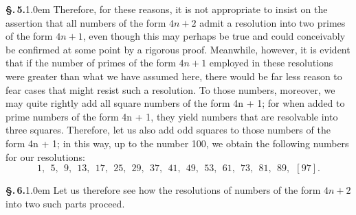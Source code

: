 \documentclass[12pt]{article}
\newcommand{\pnum}[1]{\textbf{\S.\,#1.}\kern1.0em}
\begin{document}
\pnum{5} Therefore, for these reasons, it is not appropriate to insist on the assertion that all numbers of the form $4n + 2$ admit a resolution into two primes of the form 
$4n + 1$, even though this may perhaps be true and could conceivably be confirmed at some point by a rigorous proof. Meanwhile, however, it is evident that if the number of primes of the form $4n + 1$ employed in these resolutions were greater than what we have assumed here, there would be far less reason to fear cases that might resist such a resolution. To those numbers, moreover, we may quite rightly add all square numbers of the form 4n + 1; for when added to prime numbers of the form 4n + 1, they yield numbers that are resolvable into three squares. Therefore, let us also add odd squares to those numbers of the form 4n + 1; in this way, up to the number 100, we obtain the following numbers for our resolutions:
$$1, \ \ 5, \ \ 9, \ \ 13, \ \ 17, \ \ 25, \ \ 29, \ \ 37, \ \ 41, \ \ 49, \ \ 53, \ \ 61, \ \ 73, \ \ 81, \ \ 89, \ \ [97].$$

\pnum{6} Let us therefore see how the resolutions of numbers of the form $4n+2$
into two such parts proceed. \\
\end{document}
